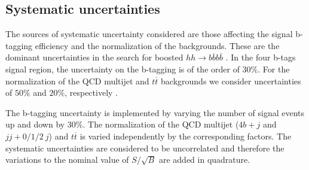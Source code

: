 \subsection{Systematic uncertainties}

The sources of systematic uncertainty considered are those affecting the signal b-tagging efficiency and the normalization of the backgrounds. These are the dominant uncertainties in the search for boosted $hh\rightarrow b\overline{b}b\overline{b}$ \cite{hh2bbbbATLAS1}. In the four b-tags signal region, the uncertainty on the b-tagging is of the order of $30\%$. For the normalization of the QCD multijet and $t\overline{t}$ backgrounds we consider uncertainties of $50\%$ and $20\%$, respectively \cite{FCCphysClement}.

The b-tagging uncertainty is implemented by varying the number of signal events up and down by $30\%$. The normalization of the QCD multijet ($4b+j$ and $jj+0/1/2~j$) and $t\overline{t}$ is varied independently by the corresponding factors. The systematic uncertainties are considered to be uncorrelated and therefore the variations to the nominal value of $S/\sqrt{B}$ are added in quadrature.


